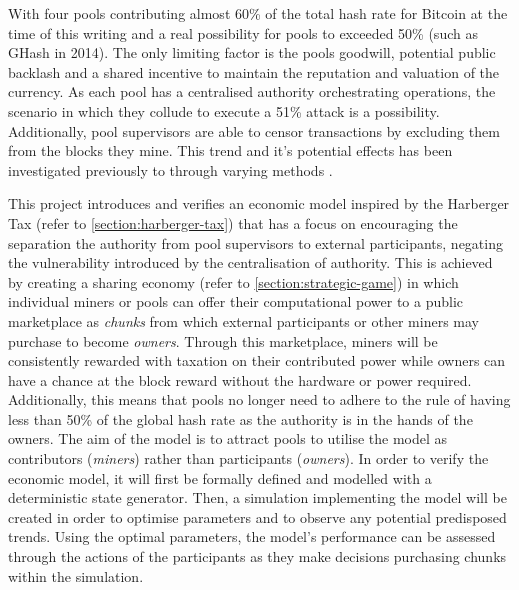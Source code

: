 With four pools contributing almost 60\% of the total hash rate for Bitcoin \cite{bitcoinpools2020} at the time of this writing and a real possibility for pools to exceeded 50\% (such as GHash \cite{ghash2019} in 2014). The only limiting factor is the pools goodwill, potential public backlash and a shared incentive to maintain the reputation and valuation of the currency. As each pool has a centralised authority orchestrating operations, the scenario in which they collude to execute a 51\% attack is a possibility. Additionally, pool supervisors are able to censor transactions by excluding them from the blocks they mine. This trend and it's potential effects has been investigated previously to through varying methods \cite{oceanic2020} \cite{centralisation2015}.

This project introduces and verifies an economic model inspired by the Harberger Tax (refer to \cref{section:harberger-tax}) that has a focus on encouraging the separation the authority from pool supervisors to external participants, negating the vulnerability introduced by the centralisation of authority. This is achieved by creating a sharing economy (refer to \cref{section:strategic-game}) in which individual miners or pools can offer their computational power to a public marketplace as \textit{chunks} from which external participants or other miners may purchase to become \textit{owners}. Through this marketplace, miners will be consistently rewarded with taxation on their contributed power while owners can have a chance at the block reward without the hardware or power required. Additionally, this means that pools no longer need to adhere to the rule of having less than 50\% of the global hash rate as the authority is in the hands of the owners. The aim of the model is to attract pools to utilise the model as contributors (\textit{miners}) rather than participants (\textit{owners}). In order to verify the economic model, it will first be formally defined and modelled with a deterministic state generator. Then, a simulation implementing the model will be created in order to optimise parameters and to observe any potential predisposed trends. Using the optimal parameters, the model's performance can be assessed through the actions of the participants as they make decisions purchasing chunks within the simulation.
